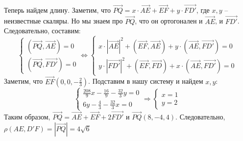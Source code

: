 \documentclass[a4paper, 12pt]{article}
\begin{document}
\begin{spacing}{1}
\begin{gather*}
\end{gather*}
Теперь найдем длину. Заметим, что $\overrightarrow{PQ} = x\cdot \overrightarrow{AE} + \overrightarrow{EF} + y \cdot \overrightarrow{FD'}$, где $x, y$ -- неизвестные скаляры. Но мы знаем про $\overrightarrow{PQ}$, что он ортогонален и $\overrightarrow{AE}$, и $\overrightarrow{FD'}$. Следовательно, составим:
$$
\begin{cases}
	(\overrightarrow{PQ}, \overrightarrow{AE}) = 0\\
	(\overrightarrow{PQ}, \overrightarrow{FD'}) = 0
\end{cases} \Leftrightarrow
\begin{cases}
	x \cdot |\overrightarrow{AE}|^2 + (\overrightarrow{EF}, \overrightarrow{AE}) + y\cdot (\overrightarrow{AE}, \overrightarrow{FD'}) = 0 \\
	y \cdot |\overrightarrow{FD'}|^2 + (\overrightarrow{EF}, \overrightarrow{FD}) + x\cdot (\overrightarrow{AE}, \overrightarrow{FD'}) = 0 
\end{cases}
$$
Заметим, что $\overrightarrow{EF}(0, 0, -\frac{2}{3})$. Подставим в нашу систему и найдем $x, y$:
$$
\begin{cases}
	\frac{208}{9}x - \frac{16}{9} - \frac{32}{3}y = 0\\
	6y - \frac{4}{3}-\frac{32}{3}x = 0 
\end{cases} \Rightarrow
\begin{cases}
	x = 1\\y = 2
\end{cases}
$$
Таким образом, $\overrightarrow{PQ} = \overrightarrow{AE} + \overrightarrow{EF} + 2\overrightarrow{FD'}$ и $\overrightarrow{PQ}(8, -4, 4)$. Следовательно, $\rho(AE, D'F) = |\overrightarrow{PQ}| = 4\sqrt{6}$\\










\end{spacing}
\end{document}
